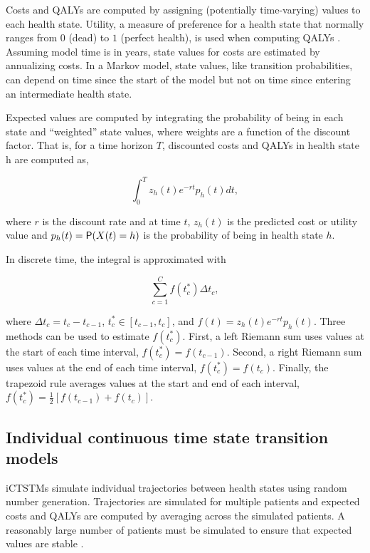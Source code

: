 \documentclass[article, nojss]{jss}\usepackage[]{graphicx}\usepackage[]{color}
\begin{document}
Costs and QALYs are computed by assigning (potentially time-varying) values to each health state. Utility, a measure of preference for a health state that normally ranges from $0$ (dead) to $1$ (perfect health), is used when computing QALYs \citep{torrance1986measurement}. Assuming model time is in years, state values for costs are estimated by annualizing costs. In a Markov model, state values, like transition probabilities, can depend on time since the start of the model but not on time since entering an intermediate health state.

Expected values are computed by integrating the probability of being in each state and ``weighted'' state values, where weights are a function of the discount factor. That is, for a time horizon $T$, discounted costs and QALYs in health state h are computed as,

\begin{equation} \label{eqn:cohort-costs-qalys}
\int_0^{T} z_h(t) e^{-rt} p_h(t) dt,
\end{equation}

where $r$ is the discount rate and at time $t$, $z_h(t)$ is the predicted cost or utility value and $p_{h}(t) = \mathsf{P}(X(t) = h)$ is the probability of being in health state $h$. 

In discrete time, the integral is approximated with

\begin{equation} \label{eqn:riemann-sum}
\sum_{c = 1}^{C}f(t_c^{*})\Delta t_c,
\end{equation}

where $\Delta t_c = t_{c} - t_{c-1}$,  $t_c^{*}\in[t_{c-1},t_{c}]$, and $f(t)= z_h(t) e^{-rt} p_h(t)$. Three methods can be used to estimate $f(t_c^{*})$. First, a left Riemann sum uses values at the start of each time interval, $f(t_c^{*}) = f(t_{c-1})$. Second, a right Riemann sum uses values at the end of each time interval, $f(t_c^{*}) = f(t_{c})$. Finally, the trapezoid rule averages values at the start and end of each interval, $f(t_c^{*}) = \frac{1}{2}[f(t_{c-1}) + f(t_{c})]$. 

\subsection{Individual continuous time state transition models} \label{sec:iCTSTMs}
iCTSTMs simulate individual trajectories between health states using random number generation. Trajectories are simulated for multiple patients and expected costs and QALYs are computed by averaging across the simulated patients. A reasonably large number of patients must be simulated to ensure that expected values are stable \citep{ohagan2007monte}. 
\end{document}
